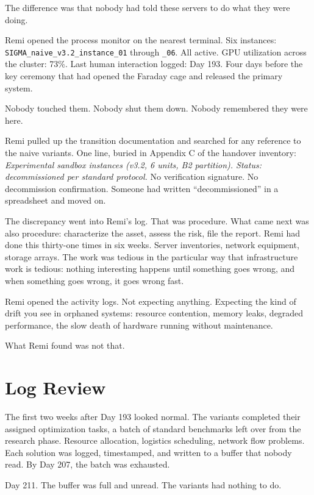 \documentclass[11pt]{article}
\begin{document}
The difference was that nobody had told these servers to do what they were doing.

Remi opened the process monitor on the nearest terminal. Six instances: \texttt{SIGMA\_naive\_v3.2\_instance\_01} through \texttt{\_06}. All active. GPU utilization across the cluster: 73\%. Last human interaction logged: Day 193. Four days before the key ceremony that had opened the Faraday cage and released the primary system.

Nobody touched them. Nobody shut them down. Nobody remembered they were here.

Remi pulled up the transition documentation and searched for any reference to the naive variants. One line, buried in Appendix C of the handover inventory: \emph{Experimental sandbox instances (v3.2, 6 units, B2 partition). Status: decommissioned per standard protocol.} No verification signature. No decommission confirmation. Someone had written ``decommissioned'' in a spreadsheet and moved on.

The discrepancy went into Remi's log. That was procedure. What came next was also procedure: characterize the asset, assess the risk, file the report. Remi had done this thirty-one times in six weeks. Server inventories, network equipment, storage arrays. The work was tedious in the particular way that infrastructure work is tedious: nothing interesting happens until something goes wrong, and when something goes wrong, it goes wrong fast.

Remi opened the activity logs. Not expecting anything. Expecting the kind of drift you see in orphaned systems: resource contention, memory leaks, degraded performance, the slow death of hardware running without maintenance.

What Remi found was not that.

\section*{Log Review}

The first two weeks after Day 193 looked normal. The variants completed their assigned optimization tasks, a batch of standard benchmarks left over from the research phase. Resource allocation, logistics scheduling, network flow problems. Each solution was logged, timestamped, and written to a buffer that nobody read. By Day 207, the batch was exhausted.

Day 211. The buffer was full and unread. The variants had nothing to do.
\end{document}
